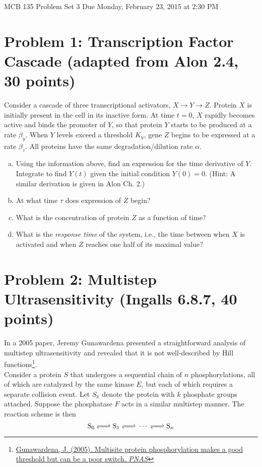 \documentclass{article}
\begin{document}
\large

MCB 135 Problem Set 3 \hfill Due Monday, February 23, 2015 at 2:30 PM

\section*{Problem 1: Transcription Factor Cascade (adapted from Alon 2.4, 30 points)}

Consider a cascade of three transcriptional activators, $X \rightarrow Y \rightarrow Z$. Protein $X$ is initially present in the cell in its inactive form. At time $t=0$, $X$ rapidly becomes active and binds the promoter of $Y$, so that protein $Y$ starts to be produced at a rate $\beta_y$. When $Y$ levels exceed a threshold $K_y$, gene $Z$ begins to be expressed at a rate $\beta_z$. All proteins have the same degradation/dilution rate $\alpha$.

\begin{enumerate}[a)]
\setlength{\itemsep}{0pt}
\item Using the information above, find an expression for the time derivative of $Y$. Integrate to find $Y(t)$ given the initial condition $Y(0)=0$. (Hint: A similar derivation is given in Alon Ch. 2.)
\item At what time $\tau$ does expression of $Z$ begin?
\item What is the concentration of protein $Z$ as a function of time? 
\item What is the \textit{response time} of the system, i.e., the time between when $X$ is activated and when $Z$ reaches one half of its maximal value?
\end{enumerate}

\section*{Problem 2: Multistep Ultrasensitivity (Ingalls 6.8.7, 40 points)}

In a 2005 paper, Jeremy Gunawardena presented a straightforward analysis of multistep ultrasensitivity and revealed that it is not well-described by Hill functions\footnote{\href{http://www.pnas.org/content/102/41/14617.abstract}{Gunawardena, J. (2005). Multisite protein phosphorylation makes a good threshold but can be a poor switch. \textit{PNAS}}}.\\

Consider a protein $S$ that undergoes a sequential chain of $n$ phosphorylations, all of which are catalyzed by the same kinase $E$, but each of which requires a separate collision event. Let $S_k$ denote the protein with $k$ phosphate groups attached. Suppose the phosphatase $F$ acts in a similar multistep manner. The reaction scheme is then
\[ \ce{S_0 <=> S_1 <=>} \cdots  \ce{<=> S_n } \]
\end{document}
